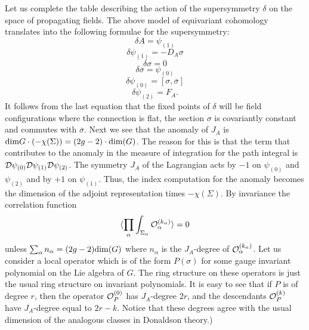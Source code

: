 Let us complete the table describing the action of the supersymmetry
$\delta$ on the space of propagating fields.
The above model of equivariant cohomology translates into the
following formulae for the supersymmetry:
$$\delta  A=\psi_{(1)}$$
$$\delta\psi_{(1)}=-D_A\sigma$$
$$\delta\sigma=0$$
$$\delta\overline\sigma=\psi_{(0)}$$
$$\delta\psi_{(0)}=[\sigma,\overline\sigma]$$
$$\delta\psi_{(2)}=F_A.$$
It follows from the last equation that the fixed points of $\delta$
will be field configurations where the connection is flat,  the
section $\sigma$ is covariantly constant and commutes with
$\overline\sigma$. 
Next we see that the anomaly of $J_A$ is ${\rm dim}{G}\cdot
(-\chi(\Sigma))=(2g-2)\cdot {\rm dim}(G)$. The reason for this is that
the term that contributes to the anomaly in the measure of integration
for the path integral is ${\cal D}\psi_{(0)}{\cal D}\psi_{(1)}{\cal
D}\psi_{(2)}$. The symmetry $J_A$ of the Lagrangian acts by $-1$ on
$\psi_{(0)}$ and $\psi_{(2)}$ and by $+1$ on $\psi_{(1)}$. Thus, the
index computation for the anomaly becomes the dimension of the adjoint
representation times $-\chi(\Sigma)$. 
By invariance the correlation function
$$\langle
\prod_\alpha\int_{\Sigma_\alpha}{\cal O}_\alpha^{(k_\alpha)}\rangle=0$$  
unless $\sum_\alpha n_\alpha=(2g-2){\rm dim}(G)$ where $n_\alpha$ is 
the $J_A$-degree of ${\cal O}_\alpha^{(k_\alpha)}$. 
Let us consider a local operator which is of the form $P(\sigma)$ for
some gauge invariant polynomial on the Lie algebra of $G$.
The ring structure on  these operators is just the usual ring
structure on invariant polynomials.
It is easy to see that if $P$ is of degree  $r$, then the operator
${\cal O}_P^{(0)}$ has $J_A$-degree $2r$, and the descendants ${\cal
O}_P^{(k)}$ have $J_A$-degree equal to $2r-k$. Notice that these
degrees agree with the usual dimension of the analogous classes in
Donaldson theory.) 

